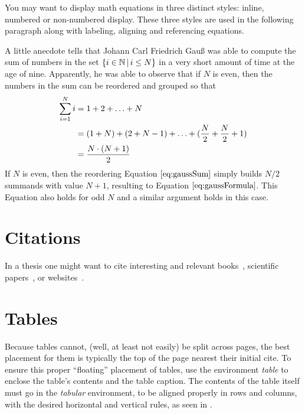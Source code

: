 \documentclass[a4paper,11pt,\myPageLayout]{book}
\begin{document}
You may want to display math equations in three distinct styles:
inline, numbered or non-numbered display. These three styles are used in the
following paragraph along with labeling, aligning and referencing equations.

A little anecdote tells that Johann Carl Friedrich Gau{\ss}
was able to compute the sum of numbers in the set
$\{i \in {\mathbb N}\,|\,i \leq N\}$ in a very short amount of time at the age of nine.
Apparently, he was able to observe that if $N$ is even, then
the numbers in the sum can be reordered and grouped so that
\begin{align}
    \sum_{i=1}^N i &= 1 + 2 + \ldots + N \notag \\
                   &= (1 + N) + (2 + N-1) + \ldots + (\frac{N}{2} + \frac{N}{2}+1) \label{eq:gaussSum}\\
                   &= \frac{N\cdot (N+1)}{2}                                            \label{eq:gaussFormula}
\end{align}
If $N$ is even, then the reordering Equation $\eqref{eq:gaussSum}$ simply builds $N/2$ summands
with value $N+1$, resulting to Equation $\eqref{eq:gaussFormula}$.
This Equation also holds for odd $N$ and a similar argument holds in this case.

\section{Citations}
\label{section:citations}

In a thesis one might want to cite interesting and relevant
books~\cite{Mueller15_FundamentalsMusicProcessig_SPRINGER,Mueller07_InformationRetrieval_SPRINGER,Habets07_SpeechDereverberation},
scientific papers~\cite{HerreT11_AudioObjects_AES,EdlerD09_TimeWarpedDCT},
or websites~\cite{Mutopia_website}.

\section{Tables}
\label{section:tables}

Because tables cannot, (well, at least not easily) be split across pages, the best
placement for them is typically the top of the page
nearest their initial cite.  To
ensure this proper ``floating'' placement of tables, use the
environment \emph{table} to enclose the table's contents and
the table caption.  The contents of the table itself must go
in the \emph{tabular} environment, to
be aligned properly in rows and columns, with the desired
horizontal and vertical rules, as seen in .
\end{document}
